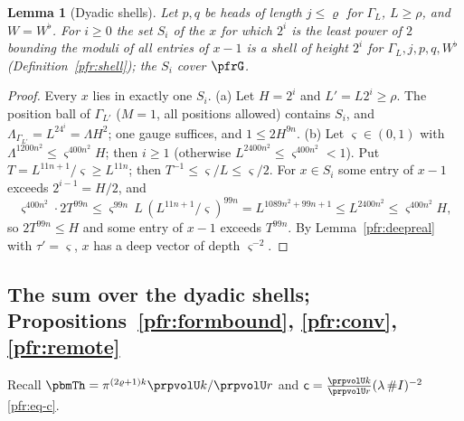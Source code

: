 \documentclass[10pt]{amsart}
\newtheorem{lemma}[theorem]{Lemma}
\theoremstyle{definition}
\theoremstyle{remark}
\begin{document}
\begin{lemma}[Dyadic shells]\label{prp:dyadic}
Let $p,q$ be heads of length $j\le\varrho$ for $\Gamma_L$, $L\ge\rho$, and $W=W^\flat$. For $i\ge0$ the set
$S_i$ of the $x$ for which $2^i$ is the least power of $2$ bounding the moduli of all entries of $x-1$ is a
shell of height $2^i$ for $\Gamma_L,j,p,q,W^\flat$ (Definition~\ref{pfr:shell}); the $S_i$ cover $\pfrG$.
\end{lemma}
\begin{proof}
Every $x$ lies in exactly one $S_i$. (a) Let $H=2^i$ and $L'=L2^i\ge\rho$. The position ball of $\Gamma_{L'}$
($M=1$, all positions allowed) contains $S_i$, and $\Lambda_{\Gamma_{L'}}=L^24^i=\Lambda H^2$; one gauge
suffices, and $1\le2H^{9n}$. (b) Let $\varsigma\in(0,1)$ with $\Lambda^{1200n^2}\le\varsigma^{400n^2}H$; then $i\ge1$
(otherwise $L^{2400n^2}\le\varsigma^{400n^2}<1$). Put $T=L^{11n+1}/\varsigma\ge L^{11n}$; then
$T^{-1}\le\varsigma/L\le\varsigma/2$. For $x\in S_i$ some entry of $x-1$ exceeds $2^{i-1}=H/2$, and
\[
\varsigma^{400n^2}\cdot2T^{99n}\le\varsigma^{99n}\,L\,(L^{11n+1}/\varsigma)^{99n}=L^{1089n^2+99n+1}\le L^{2400n^2}
\le\varsigma^{400n^2}H,
\]
so $2T^{99n}\le H$ and some entry of $x-1$ exceeds $T^{99n}$. By Lemma~\ref{pfr:deepreal} with $\tau'=\varsigma$,
$x$ has a deep vector of depth $\varsigma^{-2}$.
\end{proof}

\subsection{The sum over the dyadic shells; Propositions~\ref{pfr:formbound}, \ref{pfr:conv}, \ref{pfr:remote}}\label{prp:ss-sum}

Recall $\pbmTh=\pi^{(2\varrho+1)k}\allowbreak \prpvolU k/\prpvolU r$ and $\mathsf c=\frac{\prpvolU k}{\prpvolU r}(\lambda\,\#I)^{-2}$
\eqref{pfr:eq-c}.
\end{document}
